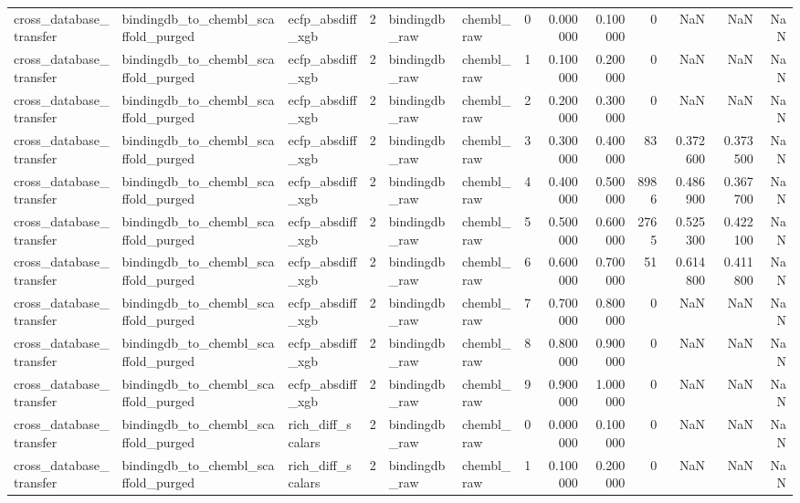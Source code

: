 \begin{longtable}{lllrllrrrrrrr}
cross\_database\_transfer & bindingdb\_to\_chembl\_scaffold\_purged & ecfp\_absdiff\_xgb & 2 & bindingdb\_raw & chembl\_raw & 0 & 0.000000 & 0.100000 & 0 & NaN & NaN & NaN \\
cross\_database\_transfer & bindingdb\_to\_chembl\_scaffold\_purged & ecfp\_absdiff\_xgb & 2 & bindingdb\_raw & chembl\_raw & 1 & 0.100000 & 0.200000 & 0 & NaN & NaN & NaN \\
cross\_database\_transfer & bindingdb\_to\_chembl\_scaffold\_purged & ecfp\_absdiff\_xgb & 2 & bindingdb\_raw & chembl\_raw & 2 & 0.200000 & 0.300000 & 0 & NaN & NaN & NaN \\
cross\_database\_transfer & bindingdb\_to\_chembl\_scaffold\_purged & ecfp\_absdiff\_xgb & 2 & bindingdb\_raw & chembl\_raw & 3 & 0.300000 & 0.400000 & 83 & 0.372600 & 0.373500 & NaN \\
cross\_database\_transfer & bindingdb\_to\_chembl\_scaffold\_purged & ecfp\_absdiff\_xgb & 2 & bindingdb\_raw & chembl\_raw & 4 & 0.400000 & 0.500000 & 8986 & 0.486900 & 0.367700 & NaN \\
cross\_database\_transfer & bindingdb\_to\_chembl\_scaffold\_purged & ecfp\_absdiff\_xgb & 2 & bindingdb\_raw & chembl\_raw & 5 & 0.500000 & 0.600000 & 2765 & 0.525300 & 0.422100 & NaN \\
cross\_database\_transfer & bindingdb\_to\_chembl\_scaffold\_purged & ecfp\_absdiff\_xgb & 2 & bindingdb\_raw & chembl\_raw & 6 & 0.600000 & 0.700000 & 51 & 0.614800 & 0.411800 & NaN \\
cross\_database\_transfer & bindingdb\_to\_chembl\_scaffold\_purged & ecfp\_absdiff\_xgb & 2 & bindingdb\_raw & chembl\_raw & 7 & 0.700000 & 0.800000 & 0 & NaN & NaN & NaN \\
cross\_database\_transfer & bindingdb\_to\_chembl\_scaffold\_purged & ecfp\_absdiff\_xgb & 2 & bindingdb\_raw & chembl\_raw & 8 & 0.800000 & 0.900000 & 0 & NaN & NaN & NaN \\
cross\_database\_transfer & bindingdb\_to\_chembl\_scaffold\_purged & ecfp\_absdiff\_xgb & 2 & bindingdb\_raw & chembl\_raw & 9 & 0.900000 & 1.000000 & 0 & NaN & NaN & NaN \\
cross\_database\_transfer & bindingdb\_to\_chembl\_scaffold\_purged & rich\_diff\_scalars & 2 & bindingdb\_raw & chembl\_raw & 0 & 0.000000 & 0.100000 & 0 & NaN & NaN & NaN \\
cross\_database\_transfer & bindingdb\_to\_chembl\_scaffold\_purged & rich\_diff\_scalars & 2 & bindingdb\_raw & chembl\_raw & 1 & 0.100000 & 0.200000 & 0 & NaN & NaN & NaN \\

\end{longtable}
